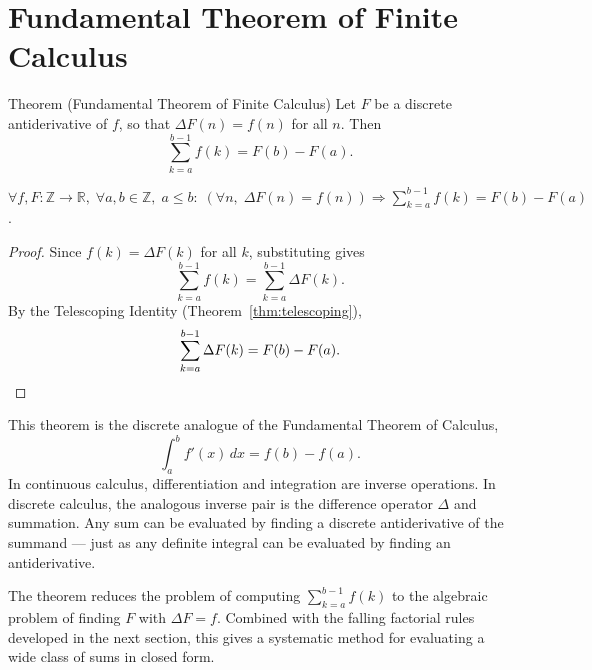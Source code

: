 
\section*{Fundamental Theorem of Finite Calculus}

\begin{theorembox}{Theorem (Fundamental Theorem of Finite Calculus)}
Let \(F\) be a discrete antiderivative of \(f\), so that
\(\Delta F(n) = f(n)\) for all \(n\). Then
\[
\sum_{k=a}^{b-1} f(k) = F(b) - F(a).
\]
\end{theorembox}
\label{thm:ftfc}

\begin{remark*}
\(\forall f,F : \mathbb{Z}\to\mathbb{R},\;
\forall a,b \in \mathbb{Z},\; a \le b:\;
(\forall n,\; \Delta F(n) = f(n))
\Rightarrow
\displaystyle\sum_{k=a}^{b-1} f(k) = F(b) - F(a)\).
\end{remark*}

\begin{proof}
Since \(f(k) = \Delta F(k)\) for all \(k\), substituting gives
\[
\sum_{k=a}^{b-1} f(k)
=
\sum_{k=a}^{b-1} \Delta F(k).
\]
By the Telescoping Identity (Theorem~\ref{thm:telescoping}),
\[
\sum_{k=a}^{b-1} \Delta F(k) = F(b) - F(a). \qedhere
\]
\end{proof}

\begin{remark*}
This theorem is the discrete analogue of the Fundamental Theorem of
Calculus,
\[
\int_a^b f'(x)\,dx = f(b)-f(a).
\]
In continuous calculus, differentiation and integration are inverse
operations. In discrete calculus, the analogous inverse pair is the
difference operator \(\Delta\) and summation. Any sum can be evaluated
by finding a discrete antiderivative of the summand --- just as any
definite integral can be evaluated by finding an antiderivative.
\end{remark*}

\begin{remark*}
The theorem reduces the problem of computing \(\sum_{k=a}^{b-1} f(k)\)
to the algebraic problem of finding \(F\) with \(\Delta F = f\). Combined
with the falling factorial rules developed in the next section, this
gives a systematic method for evaluating a wide class of sums in
closed form.
\end{remark*}

